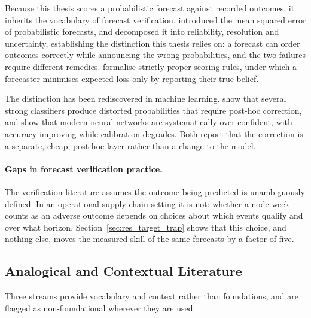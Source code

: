 Because this thesis scores a probabilistic forecast against recorded outcomes, it inherits
the vocabulary of forecast verification. \textcite{brier1950verification} introduced
the mean squared error of probabilistic forecasts, and
\textcite{murphy1973vector} decomposed it into reliability, resolution and
uncertainty, establishing the distinction this thesis relies on: a forecast can order
outcomes correctly while announcing the wrong probabilities, and the two failures require
different remedies. \textcite{gneiting2007strictly} formalise strictly
proper scoring rules, under which a forecaster minimises expected loss only by reporting
their true belief.

The distinction has been rediscovered in machine learning. \textcite{niculescu2005predicting} show that several strong classifiers produce
distorted probabilities that require post-hoc correction, and \textcite{guo2017calibration} show that modern neural networks are systematically
over-confident, with accuracy improving while calibration degrades. Both report that the
correction is a separate, cheap, post-hoc layer rather than a change to the model.

\paragraph{Gaps in forecast verification practice.}
The verification literature assumes the outcome being predicted is unambiguously defined.
In an operational supply chain setting it is not: whether a node-week counts as an adverse
outcome depends on choices about which events qualify and over what horizon.
Section~\ref{sec:res_target_trap} shows that this choice, and nothing else, moves the
measured skill of the same forecasts by a factor of five.


\subsection{Analogical and Contextual Literature}
\label{sec:lit_analogy}

Three streams provide vocabulary and context rather than foundations, and are flagged as
non-foundational wherever they are used.


